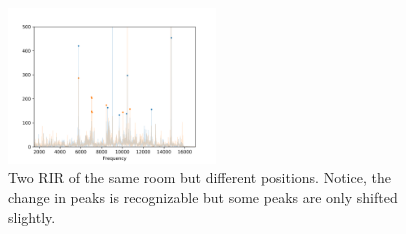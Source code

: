 \begin{figure}[h!]
\centering
\captionsetup{justification=centering,margin=1cm}
\includegraphics[width=0.49\textwidth]{images/response-same-room-different-pos.png}
\caption{
	Two RIR of the same room but different positions. Notice, the change in peaks is recognizable but some peaks are only shifted slightly.
}
\label{fig:response-same-room-different-pos}
\end{figure}
